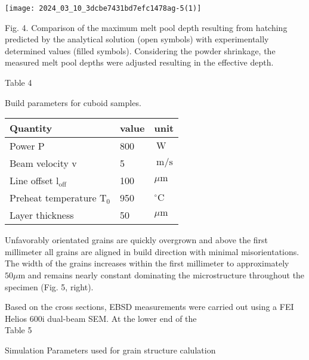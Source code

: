 \documentclass[10pt]{article}
\begin{document}
\begin{center}
\texttt{[image: 2024\_03\_10\_3dcbe7431bd7efc1478ag-5(1)]}
\end{center}

Fig. 4. Comparison of the maximum melt pool depth resulting from hatching predicted by the analytical solution (open symbols) with experimentally determined values (filled symbols). Considering the powder shrinkage, the measured melt pool depths were adjusted resulting in the effective depth.

Table 4

Build parameters for cuboid samples.

\begin{center}
\begin{tabular}{lll}
\hline
Quantity & value & unit \\
\hline
Power P & 800 & $\mathrm{~W}$ \\
Beam velocity v & 5 & $\mathrm{~m} / \mathrm{s}$ \\
Line offset $\mathrm{l}_{\text {off }}$ & 100 & $\mu \mathrm{m}$ \\
Preheat temperature $\mathrm{T}_{0}$ & 950 & ${ }^{\circ} \mathrm{C}$ \\
Layer thickness & 50 & $\mu \mathrm{m}$ \\
\hline
\end{tabular}
\end{center}

Unfavorably orientated grains are quickly overgrown and above the first millimeter all grains are aligned in build direction with minimal misorientations. The width of the grains increases within the first millimeter to approximately $50 \mu \mathrm{m}$ and remains nearly constant dominating the microstructure throughout the specimen (Fig. 5, right).

Based on the cross sections, EBSD measurements were carried out using a FEI Helios 600i dual-beam SEM. At the lower end of the\\
Table 5

Simulation Parameters used for grain structure calulation
\end{document}
